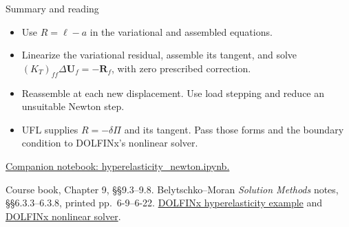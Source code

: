 \documentclass[11pt,aspectratio=169]{beamer}
\newcommand{\bU}{\bm U}
\newcommand{\bR}{\bm R}
\begin{document}
\begin{frame}{Summary and reading}
\begin{itemize}
\item Use $R=\ell-a$ in the variational and assembled equations.
\item Linearize the variational residual, assemble its tangent, and solve
$(K_T)_{ff}\Delta\bU_f=-\bR_f$, with zero prescribed correction.
\item Reassemble at each new displacement. Use load stepping and reduce an
unsuitable Newton step.
\item UFL supplies $R=-\delta\Pi$ and its tangent. Pass those forms and the
boundary condition to DOLFINx's nonlinear solver.
\end{itemize}
\vspace{0.15cm}
\href{../../../notebooks/nonlinear/hyperelasticity_newton.ipynb}{Companion notebook: hyperelasticity\_newton.ipynb.}

\small
Course book, Chapter 9, \S\S9.3--9.8.
Belytschko--Moran \emph{Solution Methods} notes, \S\S6.3.3--6.3.8,
printed pp.~6-9--6-22.
\href{https://docs.fenicsproject.org/dolfinx/main/cpp/demos/demo_hyperelasticity.html}{DOLFINx hyperelasticity example}
and \href{https://docs.fenicsproject.org/dolfinx/v0.11.0/python/generated/dolfinx.fem.petsc.html\#dolfinx.fem.petsc.NonlinearProblem}{DOLFINx nonlinear solver}.
\end{frame}
\end{document}
